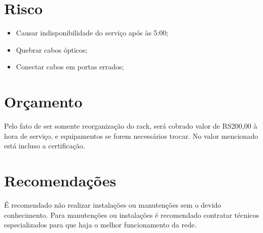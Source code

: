 \documentclass[	DIV=calc,%
paper=a4,%
fontsize=12pt,%
onecolumn]{scrartcl}	 					%
\begin{document}
	\section{Risco}
	\begin{itemize}
		\item Causar indisponibilidade do serviço após às 5:00;
		\item Quebrar cabos ópticos;
		\item Conectar cabos em portas errados;
	\end{itemize}	
	
	
	\section{Orçamento}
	Pelo fato de ser somente reorganização do rack, será cobrado valor de RS200,00 à hora de serviço, e equipamentos se forem necessários trocar. No valor mencionado está incluso a certificação.
	
	\section{Recomendações}
	É recomendado não realizar instalações ou manutenções sem o devido conhecimento. Para manutenções ou instalações é recomendado contratar técnicos especializados para que haja o melhor funcionamento da rede.

	
\end{document}
